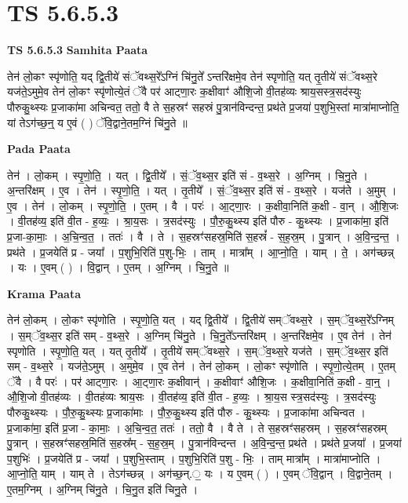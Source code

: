 \documentclass[17pt]{extarticle}
\begin{document}
\section{ TS 5.6.5.3 }

\textbf{TS 5.6.5.3 } \newline
\textbf{Samhita Paata} \newline

तेन॑ लो॒कꣳ स्पृ॑णोति॒ यद् द्वि॒तीये॑ संॅवथ्स॒रे᳚ऽग्निं चि॑नु॒ते᳚ ऽन्तरि॑क्षमे॒व तेन॑ स्पृणोति॒ यत् तृ॒तीये॑ संॅवथ्स॒रे यज॑ते॒ऽमुमे॒व तेन॑ लो॒कꣳ स्पृ॑णोत्ये॒तं ॅवै पर॑ आट्णा॒रः क॒क्षीवाꣳ॑ औशि॒जो वी॒तह॑व्यः श्राय॒सस्त्र॒सद॑स्युः पौरुकु॒थ्स्यः प्र॒जाका॑मा अचिन्वत॒ ततो॒ वै ते स॒हस्रꣳ॑ सहस्रं पु॒त्रान॑विन्दन्त॒ प्रथ॑ते प्र॒जया॑ प॒शुभि॒स्तां मात्रा॑माप्नोति॒ यां तेऽग॑च्छ॒न्॒ य ए॒वं ( ) ॅवि॒द्वाने॒तम॒ग्निं चि॑नु॒ते ॥ \newline

\textbf{Pada Paata} \newline

तेन॑ । लो॒कम् । स्पृ॒णो॒ति॒ । यत् । द्वि॒तीये᳚ । सं॒ॅव॒थ्स॒र इति॑ सं - व॒थ्स॒रे । अ॒ग्निम् । चि॒नु॒ते । अ॒न्तरि॑क्षम् । ए॒व । तेन॑ । स्पृ॒णो॒ति॒ । यत् । तृ॒तीये᳚ । सं॒ॅव॒थ्स॒र इति॑ सं - व॒थ्स॒रे । यज॑ते । अ॒मुम् । ए॒व । तेन॑ । लो॒कम् । स्पृ॒णो॒ति॒ । ए॒तम् । वै । परः॑ । आ॒ट्णा॒रः । क॒क्षीवा॒निति॑ क॒क्षी - वा॒न् । औ॒शि॒जः । वी॒तह॑व्य॒ इति॑ वी॒त - ह॒व्यः॒ । श्रा॒य॒सः । त्र॒सद॑स्युः । पौ॒रु॒कु॒थ्स्य इति॑ पौरु - कु॒थ्स्यः । प्र॒जाका॑मा॒ इति॑ प्र॒जा-का॒माः॒ । अ॒चि॒न्व॒त॒ । ततः॑ । वै । ते । स॒हस्रꣳ॑सहस्र॒मिति॑ स॒हस्रं᳚ - स॒ह॒स्र॒म् । पु॒त्रान् । अ॒वि॒न्द॒न्त॒ । प्रथ॑ते । प्र॒जयेति॑ प्र - जया᳚ । प॒शुभि॒रिति॑ प॒शु-भिः॒ । ताम् । मात्रा᳚म् । आ॒प्नो॒ति॒ । याम् । ते॒ । अग॑च्छन्न् । यः । ए॒वम् ( ) । वि॒द्वान् । ए॒तम् । अ॒ग्निम् । चि॒नु॒ते ॥  \newline


\textbf{Krama Paata} \newline

तेन॑ लो॒कम् । लो॒कꣳ स्पृ॑णोति । स्पृ॒णो॒ति॒ यत् । यद् द्वि॒तीये᳚ । द्वि॒तीये॑ सम्ॅवथ्स॒रे । स॒म्ॅव॒थ्स॒रे᳚ऽग्निम् । स॒म्ॅव॒थ्स॒र इति॑ सम् - व॒थ्स॒रे । अ॒ग्निम् चि॑नु॒ते । चि॒नु॒ते᳚ऽन्तरि॑क्षम् । अ॒न्तरि॑क्षमे॒व । ए॒व तेन॑ । तेन॑ स्पृणोति । स्पृ॒णो॒ति॒ यत् । यत् तृ॒तीये᳚ । तृ॒तीये॑ सम्ॅवथ्स॒रे । स॒म्ॅव॒थ्स॒रे यज॑ते । स॒म्ॅव॒थ्स॒र इति॑ सम् - व॒थ्स॒रे । यज॑ते॒ऽमुम् । अ॒मुमे॒व । 
ए॒व तेन॑ । तेन॑ लो॒कम् । लो॒कꣳ स्पृ॑णोति । स्पृ॒णो॒त्ये॒तम् । 
ए॒तम् ॅवै । वै परः॑ । पर॑ आट्णा॒रः । आ॒ट्णा॒रः क॒क्षीवान्॑ । क॒क्षीवाꣳ॑ औशि॒जः । क॒क्षीवा॒निति॑ क॒क्षी - वा॒न्॒ । औ॒शि॒जो वी॒तह॑व्यः । वी॒तह॑व्यः श्राय॒सः । वी॒तह॑व्य॒ इति॑ वी॒त - ह॒व्यः॒ । श्रा॒य॒स स्त्र॒सद॑स्युः । त्र॒सद॑स्युः पौरुकु॒थ्स्यः । पौ॒रु॒कु॒थ्स्यः प्र॒जाका॑माः । पौ॒रु॒कु॒थ्स्य इति॑ पौरु - कु॒थ्स्यः । प्र॒जाका॑मा अचिन्वत । प्र॒जाका॑मा॒ इति॑ प्र॒जा - का॒माः॒ । अ॒चि॒न्व॒त॒ ततः॑ । ततो॒ वै । वै ते । ते स॒हस्रꣳ॑सहस्रम् । स॒हस्रꣳ॑सहस्रम् पु॒त्रान् । स॒हस्रꣳ॑सहस्र॒मिति॑ स॒हस्र᳚म् - स॒ह॒स्र॒म् । पु॒त्रान॑विन्दन्त । अ॒वि॒न्द॒न्त॒ प्रथ॑ते । प्रथ॑ते प्र॒जया᳚ । प्र॒जया॑ प॒शुभिः॑ । प्र॒जयेति॑ प्र - जया᳚ । प॒शुभि॒स्ताम् । प॒शुभि॒रिति॑ प॒शु - भिः॒ । ताम् मात्रा᳚म् । मात्रा॑माप्नोति । आ॒प्नो॒ति॒ याम् । याम् ते । तेऽग॑च्छन्न् । अग॑च्छ॒न्.॒ यः । य ए॒वम् ( ) । ए॒वम् ॅवि॒द्वान् । वि॒द्वाने॒तम् । ए॒तम॒ग्निम् । अ॒ग्निम् चि॑नु॒ते । चि॒नु॒त इति॑ चिनु॒ते । \newline
\end{document}
